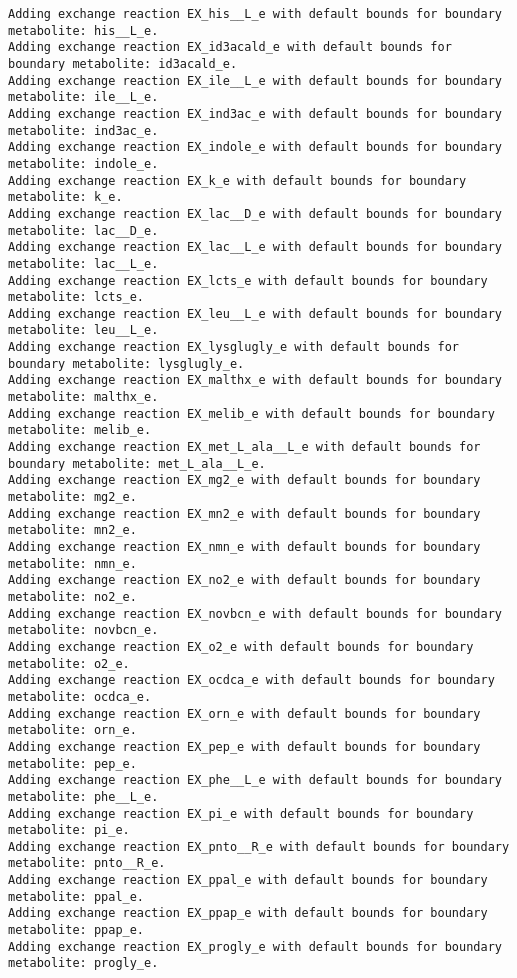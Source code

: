 \documentclass[
  letterpaper,
  DIV=11,
  numbers=noendperiod]{scrartcl}
\begin{document}
\begin{verbatim}
Adding exchange reaction EX_his__L_e with default bounds for boundary metabolite: his__L_e.
Adding exchange reaction EX_id3acald_e with default bounds for boundary metabolite: id3acald_e.
Adding exchange reaction EX_ile__L_e with default bounds for boundary metabolite: ile__L_e.
Adding exchange reaction EX_ind3ac_e with default bounds for boundary metabolite: ind3ac_e.
Adding exchange reaction EX_indole_e with default bounds for boundary metabolite: indole_e.
Adding exchange reaction EX_k_e with default bounds for boundary metabolite: k_e.
Adding exchange reaction EX_lac__D_e with default bounds for boundary metabolite: lac__D_e.
Adding exchange reaction EX_lac__L_e with default bounds for boundary metabolite: lac__L_e.
Adding exchange reaction EX_lcts_e with default bounds for boundary metabolite: lcts_e.
Adding exchange reaction EX_leu__L_e with default bounds for boundary metabolite: leu__L_e.
Adding exchange reaction EX_lysglugly_e with default bounds for boundary metabolite: lysglugly_e.
Adding exchange reaction EX_malthx_e with default bounds for boundary metabolite: malthx_e.
Adding exchange reaction EX_melib_e with default bounds for boundary metabolite: melib_e.
Adding exchange reaction EX_met_L_ala__L_e with default bounds for boundary metabolite: met_L_ala__L_e.
Adding exchange reaction EX_mg2_e with default bounds for boundary metabolite: mg2_e.
Adding exchange reaction EX_mn2_e with default bounds for boundary metabolite: mn2_e.
Adding exchange reaction EX_nmn_e with default bounds for boundary metabolite: nmn_e.
Adding exchange reaction EX_no2_e with default bounds for boundary metabolite: no2_e.
Adding exchange reaction EX_novbcn_e with default bounds for boundary metabolite: novbcn_e.
Adding exchange reaction EX_o2_e with default bounds for boundary metabolite: o2_e.
Adding exchange reaction EX_ocdca_e with default bounds for boundary metabolite: ocdca_e.
Adding exchange reaction EX_orn_e with default bounds for boundary metabolite: orn_e.
Adding exchange reaction EX_pep_e with default bounds for boundary metabolite: pep_e.
Adding exchange reaction EX_phe__L_e with default bounds for boundary metabolite: phe__L_e.
Adding exchange reaction EX_pi_e with default bounds for boundary metabolite: pi_e.
Adding exchange reaction EX_pnto__R_e with default bounds for boundary metabolite: pnto__R_e.
Adding exchange reaction EX_ppal_e with default bounds for boundary metabolite: ppal_e.
Adding exchange reaction EX_ppap_e with default bounds for boundary metabolite: ppap_e.
Adding exchange reaction EX_progly_e with default bounds for boundary metabolite: progly_e.

\end{verbatim}
\end{document}
